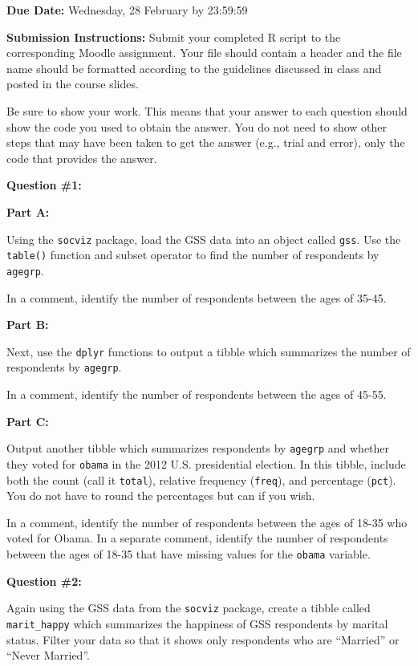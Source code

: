 \documentclass[
  letterpaper,
]{book}
\begin{document}
\textbf{Due Date:} Wednesday, 28 February by 23:59:59

\textbf{Submission Instructions:} Submit your completed R script to the
corresponding Moodle assignment. Your file should contain a header and
the file name should be formatted according to the guidelines discussed
in class and posted in the course slides.

Be sure to show your work. This means that your answer to each question
should show the code you used to obtain the answer. You do not need to
show other steps that may have been taken to get the answer (e.g., trial
and error), only the code that provides the answer.

\textbf{Question \#1:}

\textbf{Part A:}

Using the \texttt{socviz} package, load the GSS data into an object
called \texttt{gss}. Use the \texttt{table()} function and subset
operator to find the number of respondents by \texttt{agegrp}.

In a comment, identify the number of respondents between the ages of
35-45.

\textbf{Part B:}

Next, use the \texttt{dplyr} functions to output a tibble which
summarizes the number of respondents by \texttt{agegrp}.

In a comment, identify the number of respondents between the ages of
45-55.

\textbf{Part C:}

Output another tibble which summarizes respondents by \texttt{agegrp}
and whether they voted for \texttt{obama} in the 2012 U.S. presidential
election. In this tibble, include both the count (call it
\texttt{total}), relative frequency (\texttt{freq}), and percentage
(\texttt{pct}). You do not have to round the percentages but can if you
wish.

In a comment, identify the number of respondents between the ages of
18-35 who voted for Obama. In a separate comment, identify the number of
respondents between the ages of 18-35 that have missing values for the
\texttt{obama} variable.

\textbf{Question \#2:}

Again using the GSS data from the \texttt{socviz} package, create a
tibble called \texttt{marit\_happy} which summarizes the happiness of
GSS respondents by marital status. Filter your data so that it shows
only respondents who are ``Married'' or ``Never Married''.
\end{document}
